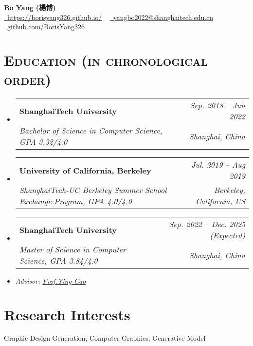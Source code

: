 \documentclass[letterpaper,11pt]{article}
\makeatletter
\newcommand{\resumeSubheading}[4]{
  \item
    \begin{tabular*}{1.0\textwidth}[t]{l@{\extracolsep{\fill}}r}
      \textbf{#1} & \textit{\small #2} \\
      \textit{\small#3} & \textit{\small #4} \\
    \end{tabular*}\vspace{-3pt}
}
\newcommand{\resumeSubHeadingListStart}{\begin{itemize}[leftmargin=0.0in, label={}]}
\newcommand{\resumeSubHeadingListEnd}{\end{itemize}}
\makeatother
\begin{document}

{\huge \textbf{Bo Yang (楊博)}} \\ \vspace{6pt}
\small  
\href{https://borisyang326.github.io/}{\raisebox{-0.2\height}\faHome\  \underline{https://borisyang326.github.io/}} ~
\href{mailto:borisyang326@gmail.com}{\raisebox{-0.2\height}\faEnvelope\  \underline{yangbo2022@shanghaitech.edu.cn}} ~ 
\href{https://github.com/BorisYang326}{\raisebox{-0.2\height}\faGithub\ \underline{github.com/BorisYang326}}
\vspace{-2pt}


\section{\textsc{Education (in chronological order)}}
  \resumeSubHeadingListStart
  \resumeSubheading
      {ShanghaiTech University}{Sep. 2018 -- Jun 2022}
      {Bachelor of Science in Computer Science, GPA 3.32/4.0}{Shanghai, China}
  \resumeSubheading
      {University of California, Berkeley}{Jul. 2019 -- Aug 2019}
      {ShanghaiTech‑UC Berkeley Summer School Exchange Program, GPA 4.0/4.0}{Berkeley, California, US}
    
    \resumeSubheading
      {ShanghaiTech University}{Sep. 2022 -- Dec. 2025 (Expected)}
      {Master of Science in Computer Science, GPA 3.84/4.0}{Shanghai, China}
      \item \small{\textit{Advisor: \href{https://www.ying-cao.com/}{Prof.Ying Cao}}}
    
  \resumeSubHeadingListEnd
  \vspace{-12pt}

\section{Research Interests}
    \qquad Graphic Design Generation; Computer Graphics; Generative Model
    \vspace{-6pt}
\end{document}
